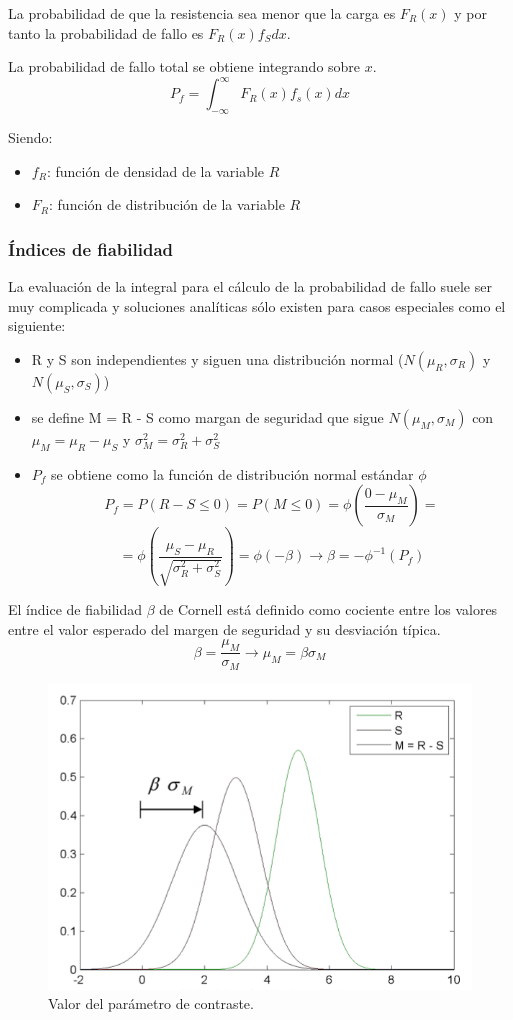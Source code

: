 La probabilidad de que la resistencia sea menor que la carga es $F_R(x)$ y por tanto la probabilidad de fallo es $F_R(x)f_Sdx$.

La probabilidad de fallo total se obtiene integrando sobre $x$.
\[ P_f = \int_{- \infty}^\infty{F_R(x) f_s (x) dx} \]

Siendo:
\begin{itemize}
    \item $f_R$: función de densidad de la variable $R$
    \item $F_R$: función de distribución de la variable $R$
\end{itemize}

\subsubsection{Índices de fiabilidad}
La evaluación de la integral para el cálculo de la probabilidad de fallo suele ser muy complicada y soluciones analíticas sólo existen para casos especiales como el siguiente:
\begin{itemize}
    \item R y S son independientes y siguen una distribución normal ($N(\mu_R, \sigma_R)$ y $N(\mu_S, \sigma_S)$)
    \item se define M = R - S como margan de seguridad que sigue $N(\mu_M, \sigma_M)$ con $\mu_M = \mu_R - \mu_S$ y $\sigma_M^2 = \sigma_R^2 + \sigma_S^2$
    \item $P_f$ se obtiene como la función de distribución normal estándar $\phi$ 
    \[ P_f = P (R - S \leq 0) = P(M \leq 0) = \phi \left( \frac{0 - \mu_M}{\sigma_M} \right) = \]
    \[ = \phi \left( \frac{\mu_S - \mu_R}{\sqrt{\sigma_R^2 + \sigma_S^2}} \right) = \phi(-\beta) \rightarrow \beta = -\phi^{-1}(P_f)\]
\end{itemize}

El índice de fiabilidad $\beta$ de Cornell está definido como cociente entre los valores entre el valor esperado del margen de seguridad y su desviación típica.
\[\beta = \frac{\mu_M}{\sigma_M} \rightarrow \mu_M = \beta \sigma_M\]

\begin{figure}[h]
    \centering
    \includegraphics[width = 0.5 \textwidth]{Imagenes/Fiabilidad estructural - Valor del parametro de contraste.png}
    \caption{Valor del parámetro de contraste.}
\end{figure}

